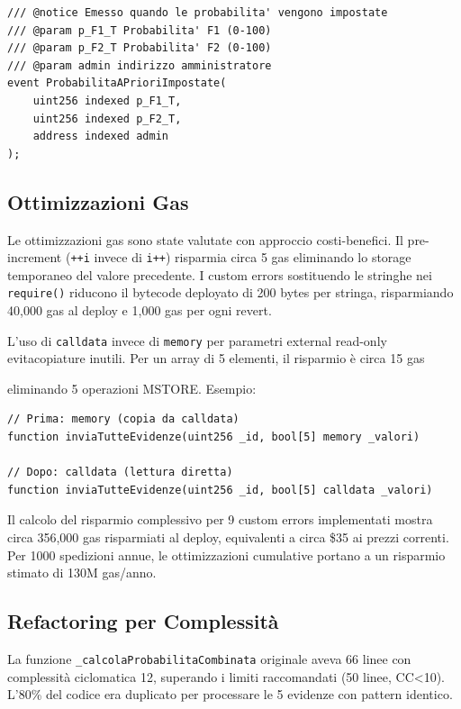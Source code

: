 \documentclass[12pt,a4paper]{article}
\begin{document}
\begin{lstlisting}[language=Solidity]
/// @notice Emesso quando le probabilita' vengono impostate
/// @param p_F1_T Probabilita' F1 (0-100)
/// @param p_F2_T Probabilita' F2 (0-100)
/// @param admin indirizzo amministratore
event ProbabilitaAPrioriImpostate(
    uint256 indexed p_F1_T, 
    uint256 indexed p_F2_T, 
    address indexed admin
);
\end{lstlisting}

\subsection{Ottimizzazioni Gas}

Le ottimizzazioni gas sono state valutate con approccio costi-benefici. Il pre-increment (\texttt{++i} invece di \texttt{i++}) risparmia circa 5 gas eliminando lo storage temporaneo del valore precedente. I custom errors sostituendo le stringhe nei \texttt{require()} riducono il bytecode deployato di 200 bytes per stringa, risparmiando 40,000 gas al deploy e 1,000 gas per ogni revert.

L'uso di \texttt{calldata} invece di \texttt{memory} per parametri external read-only evitacopiature inutili. Per un array di 5 elementi, il risparmio è circa 15 gas

 eliminando 5 operazioni MSTORE. Esempio:

\begin{lstlisting}[language=Solidity]
// Prima: memory (copia da calldata)
function inviaTutteEvidenze(uint256 _id, bool[5] memory _valori)

// Dopo: calldata (lettura diretta)
function inviaTutteEvidenze(uint256 _id, bool[5] calldata _valori)
\end{lstlisting}

Il calcolo del risparmio complessivo per 9 custom errors implementati mostra circa 356,000 gas risparmiati al deploy, equivalenti a circa \$35 ai prezzi correnti. Per 1000 spedizioni annue, le ottimizzazioni cumulative portano a un risparmio stimato di 130M gas/anno.

\subsection{Refactoring per Complessità}

La funzione \texttt{\_calcolaProbabilitaCombinata} originale aveva 66 linee con complessità ciclomatica 12, superando i limiti raccomandati (50 linee, CC<10). L'80\% del codice era duplicato per processare le 5 evidenze con pattern identico.
\end{document}
